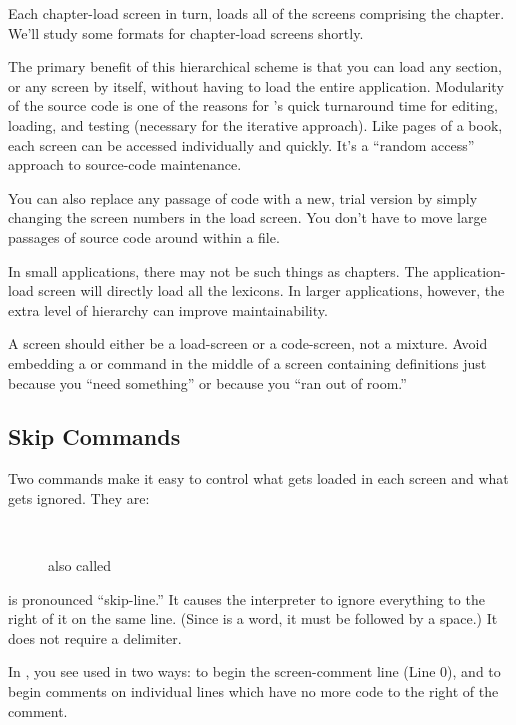 Each chapter-load screen in turn, loads all of the screens comprising
the chapter.  We'll study some formats for chapter-load screens shortly.

The primary benefit of this hierarchical scheme is that you can load
any section, or any screen by itself, without having to load the
entire application.  Modularity of the source code is one of the
reasons for \Forth{}'s quick turnaround time for editing, loading, and
testing (necessary for the iterative approach).  Like pages of a book,
each screen can be accessed individually and quickly.  It's a ``random
access'' approach to source-code maintenance.

You can also replace any passage of code with a new, trial version by
simply changing the screen numbers in the load screen.  You don't have to
move large passages of source code around within a file.

In small applications, there may not be such things as chapters.  The
application-load screen will directly load all the lexicons.  In
larger applications, however, the extra level of hierarchy can improve
maintainability.

A screen should either be a load-screen or a code-screen, not a mixture.
Avoid embedding a  or  command in the middle of a
screen containing definitions just because you ``need something'' or
because you ``ran out of room.''

\subsection{Skip Commands}%
Two commands make it easy to control what gets loaded in each screen
and what gets ignored.  They are:

\medbreak
\begin{description}
\item[\emph{\forthb{\bs}}]~
\item[\emph{}] also called 
\end{description}
\forth{\bs} is pronounced ``skip-line.'' It causes the
\Forth{} interpreter to ignore everything to the right of it on the
same line. (Since \forth{\bs} is a \Forth{} word, it must be followed
by a space.) It does not require a delimiter.

In , you see \forth{\bs} used in two ways: to begin the
screen-comment line (Line 0), and to begin comments on individual
lines which have no more code to the right of the comment.

